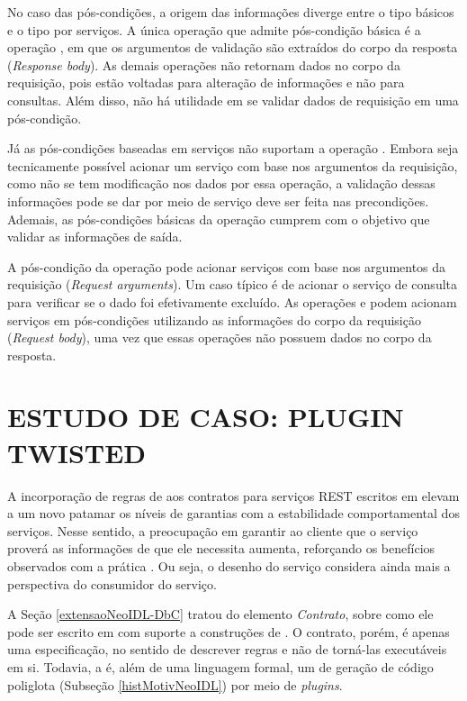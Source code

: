 No caso das pós-condições, a origem das informações diverge entre o tipo
básicos e o tipo por serviços. A única operação que admite pós-condição básica é
a operação , em que os argumentos de validação são extraídos do
corpo da resposta (\textit{Response body}). As demais operações não retornam dados
no corpo da requisição, pois estão voltadas para alteração de informações e não
para consultas. Além disso, não há utilidade em se validar dados de requisição
em uma pós-condição.

Já as pós-condições baseadas em serviços não suportam a operação .
Embora seja tecnicamente possível acionar um serviço com base nos argumentos da
requisição, como não se tem modificação nos dados por essa operação, a
validação dessas informações pode se dar por meio de serviço deve ser feita nas
precondições. Ademais, as pós-condições básicas da operação  cumprem
com o objetivo que validar as informações de saída.

A pós-condição da operação  pode acionar serviços com base nos
argumentos da requisição (\textit{Request arguments}). Um caso típico é de
acionar o serviço de consulta para verificar se o dado foi efetivamente
excluído. As operações  e  podem acionam serviços em
pós-condições utilizando as informações do corpo da requisição (\textit{Request
body}), uma vez que essas operações não possuem dados no corpo da resposta. 



\section{ESTUDO DE CASO: PLUGIN TWISTED}
\label{pluginTwisted}

A incorporação de regras de \designbycontract{} aos contratos para
serviços REST escritos em \neoidl{} elevam a um novo patamar os níveis de
garantias com a estabilidade comportamental dos serviços. Nesse sentido, a
preocupação em garantir ao cliente que o serviço proverá as informações de que
ele necessita aumenta, reforçando os benefícios observados com a prática
\CtFirst{}. Ou seja, o desenho do serviço considera ainda mais a perspectiva do
consumidor do serviço.

A Seção \ref{extensaoNeoIDL-DbC} tratou do elemento \emph{Contrato}, sobre como
ele pode ser escrito em \neoidl{} com suporte a construções de
\designbycontract{}. O contrato, porém, é apenas uma especificação, no
sentido de descrever regras e não de torná-las executáveis em si. Todavia, a
\neoidl{} é, além de uma linguagem formal, um \framework{} de geração de
código poliglota (Subseção \ref{histMotivNeoIDL}) por meio de \textit{plugins}.

